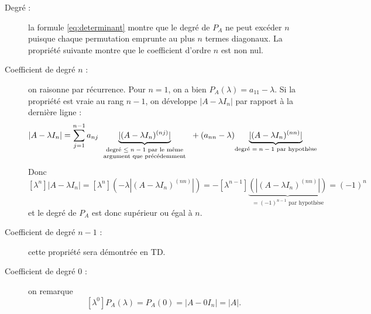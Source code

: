 \proof
\begin{description}
  \item[Degré :] la formule \eqref{eq:determinant} montre que le degré de $P_A$ ne peut excéder $n$ puisque chaque permutation emprunte au plus $n$ termes diagonaux. La propriété suivante montre que le coefficient d'ordre $n$ est non nul.
  \item[Coefficient de degré $n$ :] on raisonne par récurrence. Pour $n = 1$, on a bien $P_A(\lambda) = a_{11} - \lambda$. Si la propriété est vraie au rang $n-1$, on développe $|A - \lambda I_n|$ par rapport à la dernière ligne : 
  $$
  |A - \lambda I_n| 
  = \sum_{j=1}^{n-1} a_{nj} \underset{\scriptsize
    \begin{tabular}{c}\text{degré $\leq n-1$ par le même} \\
    \text{argument que précédemment}\end{tabular}
    }{\underbrace{|(A - \lambda I_n)^{(nj)}|}} + (a_{nn} - \lambda) \underset{\text{degré $= n-1$ par hypothèse}}{\underbrace{|(A - \lambda I_n)^{(nn)}|}}
  $$
  Donc
  $$
  [\lambda^n]|A - \lambda I_n| 
  = [\lambda^n](-\lambda |(A - \lambda I_n)^{(nn)}|) 
  = - [\lambda^{n-1}]\underset{\text{$= (-1)^{n-1}$ par hypothèse}}{\underbrace{(|(A - \lambda I_n)^{(nn)}|)}}
  = (-1)^n
  $$
  et le degré de $P_A$ est donc supérieur ou égal à $n$.
  \item[Coefficient de degré $n-1$ :] cette propriété sera démontrée en TD.
  \item[Coefficient de degré $0$ :] on remarque
    $$
    [\lambda^0]P_A(\lambda) = P_A(0) = |A - 0 I_n| = |A|.
    $$
\end{description}
